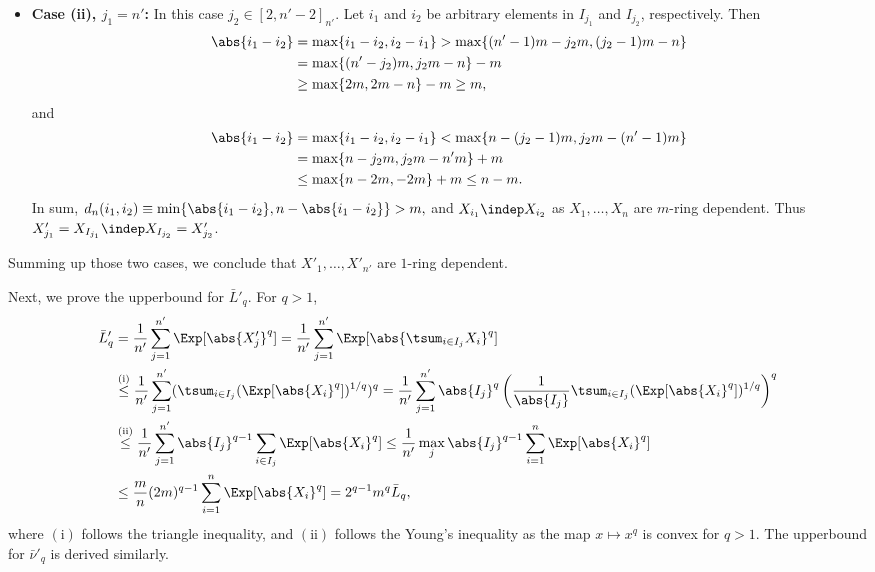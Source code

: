 \documentclass[aos]{imsart}
\begin{document}
\begin{appendix}
\begin{itemize}
    \item {\bf Case (ii), $j_1 = n'$:} In this case $j_2 \in [2, n'-2]_{n'}$. Let $i_1$ and $i_2$ be arbitrary elements in $I_{j_1}$ and $I_{j_2}$, respectively. Then
    \begin{equation*}
    \begin{aligned}
        \abs{i_1 - i_2} 
        & = \max\{i_1 - i_2, i_2 - i_1\}
        > \max\{ (n'-1)m - j_2m, (j_2-1)m - n \} \\
        & = \max\{(n' - j_2)m, j_2m - n\} - m \\
        & \geq \max\{2m, 2m - n\} - m \geq m,
    \end{aligned}
    \end{equation*}
    and
    \begin{equation*}
    \begin{aligned}
        \abs{i_1 - i_2} 
        & = \max\{i_1 - i_2, i_2 - i_1\}
        < \max\{ n - (j_2-1)m, j_2m - (n'-1)m \} \\
        & = \max\{n - j_2 m, j_2m - n'm\} + m \\
        & \leq \max\{n - 2m, -2m\} + m \leq n - m.
    \end{aligned}
    \end{equation*}
    In sum,
    \(
        d_n(i_1, i_2) \equiv \min\{\abs{i_1-i_2}, n-\abs{i_1-i_2}\}
        > m,
    \)
    and $X_{i_1} \indep X_{i_2}$ as $X_1, \dots, X_n$ are $m$-ring dependent. Thus $X'_{j_1} = X_{I_{j_1}} \indep X_{I_{j_2}} = X'_{j_2}$.
\end{itemize}
%
Summing up those two cases, we conclude that $X'_1, \dots, X'_{n'}$ are $1$-ring dependent.

Next, we prove the upperbound for $\bar{L}'_q$. For $q > 1$,
\begin{equation*}
\begin{aligned}
    \bar{L}'_q 
    & = \frac{1}{n'} \sum_{j=1}^{n'} \Exp[\abs{X'_{j}}^q]
    = \frac{1}{n'} \sum_{j=1}^{n'} \Exp[\abs{\tsum_{i \in I_j} X_i}^q] \\
    & \overset{\mathrm{(i)}}{\leq} \frac{1}{n'} \sum_{j=1}^{n'} (\tsum_{i \in I_j} (\Exp[\abs{X_i}^q])^{1/q} )^q 
    = \frac{1}{n'} \sum_{j=1}^{n'} \abs{I_j}^q \left( 
       \frac{1}{\abs{I_j}} \tsum_{i \in I_j} (\Exp[\abs{X_i}^q])^{1/q} 
    \right)^q \\
    & \overset{\mathrm{(ii)}}{\leq} \frac{1}{n'} \sum_{j=1}^{n'} \abs{I_j}^{q-1} \sum_{i \in I_j} \Exp[\abs{X_i}^q]
    \leq \frac{1}{n'} \max_j \abs{I_j}^{q-1} \sum_{i=1}^{n} \Exp[\abs{X_i}^q] \\
    & \leq \frac{m}{n} (2m)^{q-1} \sum_{i=1}^{n} \Exp[\abs{X_i}^q]
    = 2^{q-1} m^q \bar{L}_q,
\end{aligned}
\end{equation*}
where $\mathrm{(i)}$ follows the triangle inequality, and $\mathrm{(ii)}$ follows the Young's inequality as the map $x \mapsto x^q$ is convex for $q > 1$.
The upperbound for $\bar{\nu}'_q$ is derived similarly.   


\end{appendix}
\end{document}
